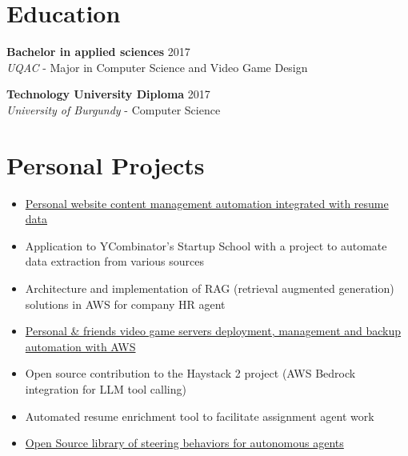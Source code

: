 ﻿\documentclass[11pt,letterpaper]{article}
\begin{document}
\section*{Education}
\textbf{Bachelor in applied sciences} \hfill 2017\\
\textit{UQAC} - Major in Computer Science and Video Game Design

\textbf{Technology University Diploma} \hfill 2017\\
\textit{University of Burgundy} - Computer Science

\section*{Personal Projects}
\begin{itemize}
\item \href{https://github.com/FloRul/portfolio}{Personal website content management automation integrated with resume data}
\item Application to YCombinator's Startup School with a project to automate data extraction from various sources
\item Architecture and implementation of RAG (retrieval augmented generation) solutions in AWS for company HR agent
\item \href{https://github.com/FloRul/Satiserver}{Personal \& friends video game servers deployment, management and backup automation with AWS}
\item Open source contribution to the Haystack 2 project (AWS Bedrock integration for LLM tool calling)
\item Automated resume enrichment tool to facilitate assignment agent work
\item \href{https://github.com/FloRul/RitFlocking}{Open Source library of steering behaviors for autonomous agents}
\end{itemize}
\end{document}
